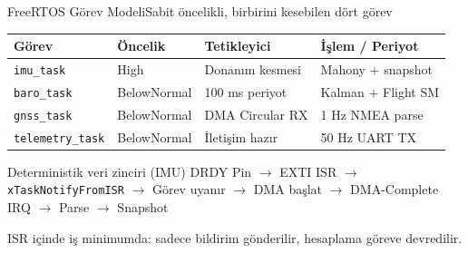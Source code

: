 \begin{frame}{FreeRTOS Görev Modeli}{Sabit öncelikli, birbirini kesebilen dört görev}
  \begin{table}
    \centering\small
    \begin{tabular}{@{}llll@{}}
      \toprule
      \textbf{Görev} & \textbf{Öncelik} & \textbf{Tetikleyici} & \textbf{İşlem / Periyot} \\
      \midrule
      \texttt{imu\_task}       & High        & Donanım kesmesi    & Mahony + snapshot \\
      \texttt{baro\_task}      & BelowNormal & 100 ms periyot     & Kalman + Flight SM \\
      \texttt{gnss\_task}      & BelowNormal & DMA Circular RX    & 1 Hz NMEA parse \\
      \texttt{telemetry\_task} & BelowNormal & İletişim hazır     & 50 Hz UART TX \\
      \bottomrule
    \end{tabular}
  \end{table}
  \vspace{6pt}
  \begin{exampleblock}{Deterministik veri zinciri (IMU)}
    \centering\small
    DRDY Pin $\rightarrow$ EXTI ISR $\rightarrow$ \texttt{xTaskNotifyFromISR} $\rightarrow$
    Görev uyanır $\rightarrow$ DMA başlat $\rightarrow$ DMA-Complete IRQ $\rightarrow$
    Parse $\rightarrow$ Snapshot
  \end{exampleblock}
  \centering\footnotesize
  ISR içinde iş minimumda: sadece bildirim gönderilir, hesaplama göreve devredilir.
\end{frame}

